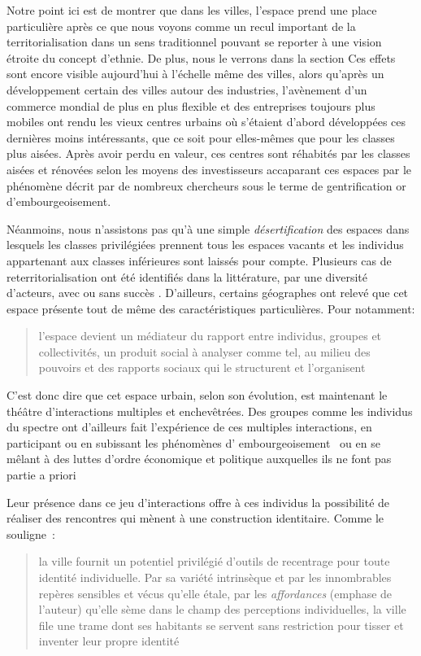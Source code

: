 Notre point ici est de montrer que dans les villes, l'espace prend une place particulière après ce que nous voyons comme un recul important de la territorialisation dans un sens traditionnel pouvant se reporter à une vision étroite du concept d'ethnie. 
De plus, nous le verrons dans la section  Ces effets sont encore visible aujourd'hui à l'échelle même des villes, alors qu'après un développement certain des villes autour des industries, l'avènement d'un commerce mondial de plus en plus flexible et des entreprises toujours plus mobiles ont rendu les vieux centres urbains où s'étaient d'abord développées ces dernières moins intéressants, que ce soit pour elles-mêmes que pour les classes plus aisées. 
Après avoir perdu en valeur, ces centres sont réhabités par les classes aisées et rénovées selon les moyens des investisseurs accaparant ces espaces par le phénomène décrit par de nombreux chercheurs sous le terme de gentrification or d'embourgeoisement.

Néanmoins, nous n'assistons pas qu'à une simple \emph{désertification} des espaces dans lesquels les classes privilégiées prennent tous les espaces vacants et les individus appartenant aux classes inférieures sont laissés pour compte.
Plusieurs cas de reterritorialisation ont été identifiés dans la littérature, par une diversité d'acteurs, avec ou sans succès \citet{Hatvany2005}. 
D'ailleurs, certains géographes ont relevé que cet espace présente tout de même des caractéristiques particulières. 
Pour \citeauthor{Courville1991} notamment: \blockquote[{\cite[41]{Courville1991}}][.]{l'espace devient un médiateur du rapport entre individus, groupes et collectivités, un produit social à analyser comme tel, au milieu des pouvoirs et des rapports sociaux qui le structurent et l'organisent}.

C'est donc dire que cet espace urbain, selon son évolution, est maintenant le théâtre d'interactions multiples et enchevêtrées. 
Des groupes comme les individus du spectre \lgbt{} ont d'ailleurs fait l'expérience de ces multiples interactions, en participant ou en subissant les phénomènes d’ embourgeoisement~\autocite{Podmore2001,Giraud2014,Hogan2005} ou en se mêlant à des luttes d'ordre économique et politique auxquelles ils ne font pas partie a priori~\autocite{Kelliher2014} 

Leur présence dans ce jeu d'interactions offre à ces individus la possibilité de réaliser des rencontres qui mènent à une construction identitaire. 
Comme le souligne~\citeauthor{DiMeo2007}: \blockquote[{\cite[81]{DiMeo2007}}][.]{\textelp{} la ville fournit un potentiel privilégié d’outils de recentrage pour toute identité individuelle. Par sa variété intrinsèque et par les innombrables repères sensibles et vécus qu’elle étale, par les \emph{affordances} (emphase de l'auteur) qu’elle sème dans le champ des perceptions individuelles, la ville file une trame dont ses habitants se servent sans restriction pour tisser et inventer leur propre identité}.

